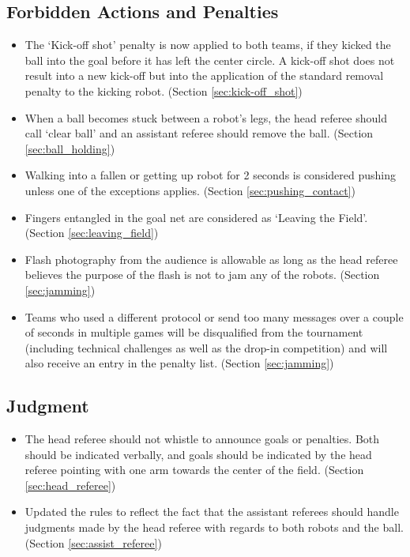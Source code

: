 \documentclass[12pt]{article}
\begin{document}
\subsection*{Forbidden Actions and Penalties}
\begin{itemize}
	\item The `Kick-off shot' penalty is now applied to both teams, if they kicked the ball into the goal before it has left the center circle. A kick-off shot does not result into a new kick-off but into the application of the standard removal penalty to the kicking robot. (Section \ref{sec:kick-off_shot})
	\item  When a ball becomes stuck between a robot's legs, the head referee should call `clear ball' and an assistant referee should remove the ball. (Section \ref{sec:ball_holding})
	\item Walking into a fallen or getting up robot for 2 seconds is considered pushing unless one of the exceptions applies. (Section \ref{sec:pushing_contact})
	\item Fingers entangled in the goal net are considered as `Leaving the Field'. (Section \ref{sec:leaving_field})
	\item Flash photography from the audience is allowable as long as the head referee believes the purpose of the flash is not to jam any of the robots. (Section \ref{sec:jamming})
	\item Teams who used a different protocol or send too many messages over a couple of seconds in multiple games will be disqualified from the tournament (including technical challenges as well as the drop-in competition) and will also receive an entry in the penalty list. (Section \ref{sec:jamming})
\end{itemize}

\subsection*{Judgment}
\begin{itemize}
	\item The head referee should not whistle to announce goals or penalties.  Both should be indicated verbally, and goals should be indicated by the head referee pointing with one arm towards the center of the field. (Section \ref{sec:head_referee})
	\item Updated the rules to reflect the fact that the assistant referees should handle judgments made by the head referee with regards to both robots and the ball. (Section \ref{sec:assist_referee})
\end{itemize}
\end{document}
